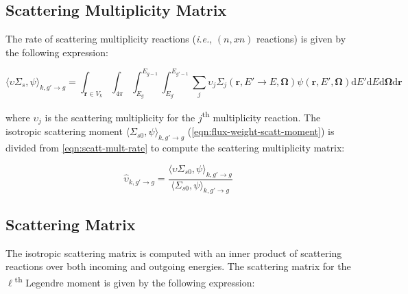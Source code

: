 \subsection{Scattering Multiplicity Matrix}
\label{subsubsec:tally-types-mult-mat}

The rate of scattering multiplicity reactions (\textit{i.e.}, $(n,xn)$ reactions) is given by the following expression:

\begin{equation}
\label{eqn:scatt-mult-rate}
\langle \upsilon \Sigma_{s}, \psi \rangle_{k,g'\rightarrow g} = \int_{\mathbf{r} \in V_{k}} \int_{4\pi} \int_{E_g}^{E_{g-1}} \int_{E_{g'}}^{E_{g'-1}} \sum_j \upsilon_j \Sigma_j (\mathbf{r}, E' \rightarrow E, \mathbf{\Omega}) \psi(\mathbf{r}, E', \mathbf{\Omega}) \mathrm{d}E'\mathrm{d}E\mathrm{d}\mathbf{\Omega}\mathrm{d}\mathbf{r}
\end{equation}

\noindent where $\upsilon_j$ is the scattering multiplicity for the $j$\textsuperscript{th} multiplicity reaction. The isotropic scattering moment $\langle \Sigma_{s0}, \psi \rangle_{k,g'\rightarrow g}$ (\cref{eqn:flux-weight-scatt-moment}) is divided from \cref{eqn:scatt-mult-rate} to compute the scattering multiplicity matrix:

\begin{equation}
\label{eqn:scatt-mult-mat}
\hat{\upsilon}_{k,g'\rightarrow g} = \frac{{\langle \upsilon \Sigma_{s0}, \psi \rangle}_{k,g'\rightarrow g}}{{\langle \Sigma_{s0}, \psi \rangle}_{k,g'\rightarrow g}}
\end{equation}


\subsection{Scattering Matrix}
\label{subsubsec:tally-types-scatt-mat}

The isotropic scattering matrix is computed with an inner product of scattering reactions over both incoming and outgoing energies. The scattering matrix for the $\ell$\textsuperscript{th} Legendre moment is given by the following expression:



